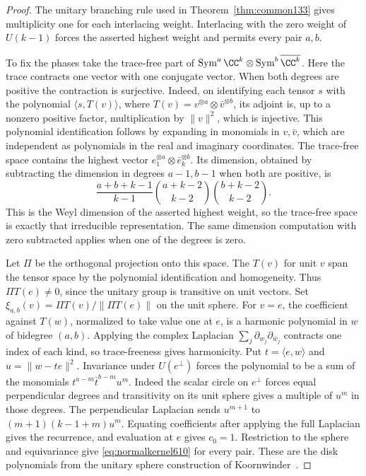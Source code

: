 \documentclass[a4paper,11pt]{article}
\theoremstyle{definition}
\theoremstyle{remark}
\numberwithin{equation}{section}
\begin{document}
\begin{proof}
The unitary branching rule used in Theorem~\ref{thm:common133}
gives multiplicity one for each interlacing weight. Interlacing
with the zero weight of \(U(k-1)\) forces the asserted highest
weight and permits every pair \(a,b\).

To fix the phases take the trace-free part of
\(\operatorname{Sym}^a\CC^k\otimes\operatorname{Sym}^b\overline{\CC^k}\).
Here the trace contracts one vector with one conjugate vector.
When both degrees are positive the contraction is surjective.
Indeed, on identifying each tensor \(s\) with the polynomial
\(\langle s,T(v)\rangle\), where
\(T(v)=v^{\otimes a}\otimes\bar v^{\otimes b}\), its adjoint is,
up to a nonzero positive factor, multiplication by \(\|v\|^2\),
which is injective. This polynomial identification follows by
expanding in monomials in \(v,\bar v\), which are independent as
polynomials in the real and imaginary coordinates. The trace-free
space contains the highest vector \(e_1^{\otimes a}\otimes
\bar e_k^{\otimes b}\). Its dimension, obtained by subtracting
the dimension in degrees \(a-1,b-1\) when both are positive, is
\[
 \frac{a+b+k-1}{k-1}
       \binom{a+k-2}{k-2}\binom{b+k-2}{k-2}.
\]
This is the Weyl dimension of the asserted highest weight, so
the trace-free space is exactly that irreducible representation.
The same dimension computation with zero subtracted applies when
one of the degrees is zero.

Let \(\Pi\) be the orthogonal projection onto this space. The
\(T(v)\) for unit \(v\) span the tensor space by the polynomial
identification and homogeneity. Thus \(\Pi T(e)\ne0\), since
the unitary group is transitive on unit vectors. Set
\(\xi_{a,b}(v)=\Pi T(v)/\|\Pi T(e)\|\) on the unit sphere.
For \(v=e\), the coefficient against \(T(w)\), normalized to
take value one at \(e\), is a harmonic polynomial in \(w\) of
bidegree \((a,b)\). Applying the complex Laplacian
\(\sum_j\partial_{w_j}\partial_{\bar w_j}\) contracts one
index of each kind, so trace-freeness gives harmonicity. Put
\(t=\langle e,w\rangle\) and \(u=\|w-te\|^2\). Invariance under
\(U(e^\perp)\) forces the polynomial to be a sum of the monomials
\(t^{a-m}\bar t^{b-m}u^m\). Indeed the scalar circle on
\(e^\perp\) forces equal perpendicular degrees and transitivity on
its unit sphere gives a multiple of \(u^m\) in those degrees.
The perpendicular Laplacian sends \(u^{m+1}\) to
\((m+1)(k-1+m)u^m\). Equating coefficients after applying the
full Laplacian gives the recurrence, and evaluation at \(e\)
gives \(c_0=1\). Restriction to the sphere and equivariance give
\eqref{eq:normalkernel610} for every pair. These are the disk
polynomials from the unitary sphere construction of
Koornwinder~\cite{XXII-XVII-koornwinder610}.


\end{proof}
\end{document}
